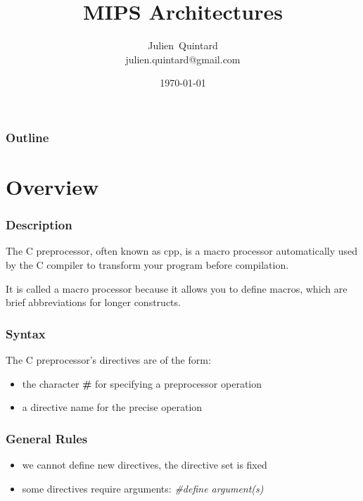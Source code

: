 \documentclass[8pt]{beamer}
\title{MIPS Architectures}
\author
{
  Julien~Quintard\inst{1} \\
  {\tiny julien.quintard@gmail.com}
}
\institute
{
  \inst{1} kaneton microkernel project
}
\date{\today}
\newcommand{\nl}[0]{\vspace{0.4cm}}
\begin{document}
%
%

\begin{frame}
  \titlepage

  \begin{center}
     \hspace{0.1cm}  \hspace{0.1cm}
     \hspace{0.1cm}
  \end{center}
\end{frame}

%
%

\begin{frame}
  \frametitle{Outline}
  \tableofcontents
\end{frame}

%
%

\section{Overview}


\begin{frame}
  \frametitle{Description}

  The C preprocessor, often known as cpp, is a macro processor
  automatically used by the C compiler to transform your program
  before compilation.

  \nl

  It is called a macro processor because it allows you to define macros,
  which are brief abbreviations for longer constructs.
\end{frame}


\begin{frame}
  \frametitle{Syntax}

  The C preprocessor's directives are of the form:

  \begin{itemize}[<+->]
    \item
      the character \textbf{\#} for specifying a preprocessor operation
    \item
      a directive name for the precise operation
  \end{itemize}
\end{frame}


\begin{frame}
  \frametitle{General Rules}

  \begin{itemize}[<+->]
    \item
      we \alert{cannot} define new directives, the directive set is fixed
    \item
      some directives require arguments: \textit{\#define argument(s)}
  \end{itemize}
\end{frame}
\end{document}
